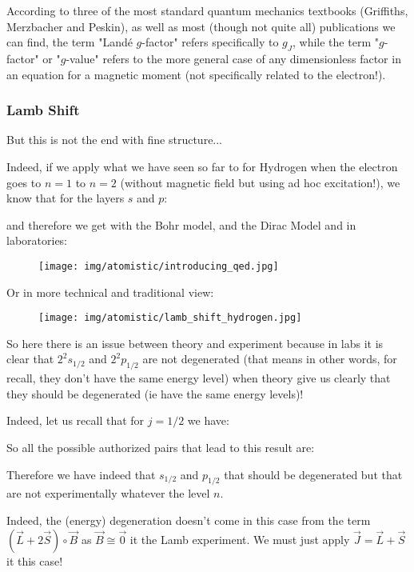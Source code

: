 	\begin{tcolorbox}[title=Remark,colframe=black,arc=10pt]
	According to three of the most standard quantum mechanics textbooks (Griffiths, Merzbacher and Peskin), as well as most (though not quite all) publications we can find, the term "Landé $g$-factor" refers specifically to $g_J$, while the term "$g$-factor" or "$g$-value" refers to the more general case of any dimensionless factor in an equation for a magnetic moment (not specifically related to the electron!).
	\end{tcolorbox}
	
	\subsubsection{Lamb Shift}
	But this is not the end with fine structure...
	
	Indeed, if we apply what we have seen so far to for Hydrogen when the electron goes to $n=1$ to $n=2$ (without magnetic field but using ad hoc excitation!), we know that for the layers $s$ and $p$:
	
	and therefore we get with the Bohr model, and the Dirac Model and in laboratories:
	\begin{figure}[H]
		\centering
		\texttt{[image: img/atomistic/introducing\_qed.jpg]}
	\end{figure}
	Or in more technical and traditional view:
	\begin{figure}[H]
		\centering
		\texttt{[image: img/atomistic/lamb\_shift\_hydrogen.jpg]}
	\end{figure}
	So here there is an issue between theory and experiment because in labs it is clear that $2^2s_{1/2}$ and $2^2p_{1/2}$ are not degenerated (that means in other words, for recall, they don't have the same energy level) when theory give us clearly that they should be degenerated (ie have the same energy levels)!

	Indeed, let us recall that for $j=1/2$ we have:
	
	So all the possible authorized pairs that lead to this result are:
	
	Therefore we have indeed that $s_{1/2}$ and $p_{1/2}$ that should be degenerated but that are not experimentally whatever the level $n$. 

	Indeed, the (energy) degeneration doesn't come in this case from the term $(\vec{L}+2\vec{S})\circ\vec{B}$ as $\vec{B}\cong \vec{0}$ it the Lamb experiment. We must just apply $\vec{J}=\vec{L}+\vec{S}$ it this case!
	
